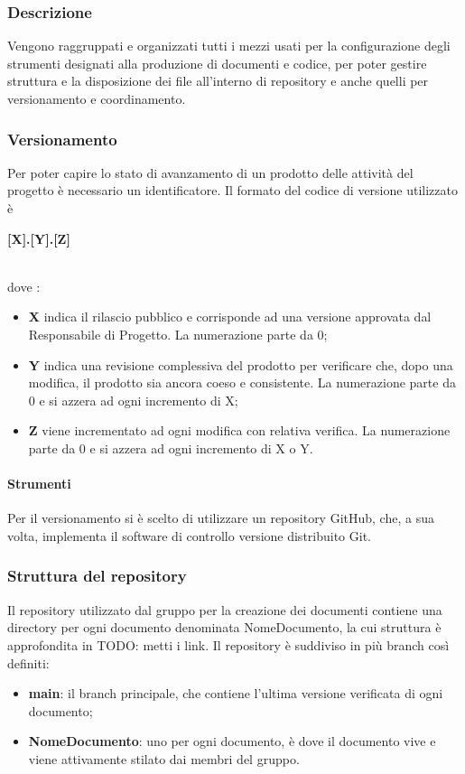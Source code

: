 \subsubsection{Descrizione}
Vengono raggruppati e organizzati tutti i mezzi usati per la configurazione degli strumenti designati alla produzione di documenti e codice, per poter gestire struttura e la disposizione dei file all’interno di repository e anche  quelli per versionamento e coordinamento.

\subsubsection{Versionamento}
Per poter capire lo stato di avanzamento di un prodotto delle attività del progetto è necessario un identificatore. Il formato del codice di versione utilizzato è \\
\centerline{\textbf{[X].[Y].[Z]}} \\ 
dove :
\begin{itemize}
\item \textbf{X} indica il rilascio pubblico e corrisponde ad una versione approvata dal Responsabile di Progetto. La numerazione parte da 0;
\item \textbf{Y} indica una revisione complessiva del prodotto per verificare che, dopo una modifica, il prodotto sia ancora coeso e consistente. La numerazione parte da 0 e si azzera ad ogni incremento di X;
\item \textbf{Z} viene incrementato ad ogni modifica con relativa verifica. La numerazione parte da 0 e si azzera ad ogni incremento di X o Y.
\end{itemize}

\paragraph{Strumenti}
Per il versionamento si è scelto di utilizzare un repository GitHub, che, a sua volta, implementa il software di controllo versione distribuito Git.

\subsubsection{Struttura del repository}
Il repository utilizzato dal gruppo per la creazione dei documenti contiene una directory per ogni documento denominata NomeDocumento, la cui struttura è approfondita in TODO: metti i link.
Il repository è suddiviso in più branch così definiti:
\begin{itemize}
\item \textbf{main}: il branch principale, che contiene l'ultima versione verificata di ogni documento;
\item \textbf{NomeDocumento}: uno per ogni documento, è dove il documento vive e viene attivamente stilato dai membri del gruppo.
\end{itemize}

